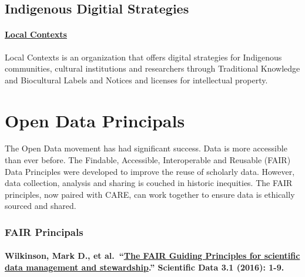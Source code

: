 \documentclass[
]{book}
\begin{document}
\hypertarget{indigenous-digitial-strategies}{%
\section{Indigenous Digitial Strategies}\label{indigenous-digitial-strategies}}

\hypertarget{local-contexts}{%
\subsubsection*{\texorpdfstring{\href{https://localcontexts.org/labels/biocultural-labels/}{Local Contexts}}{Local Contexts}}\label{local-contexts}}

Local Contexts is an organization that offers digital strategies for Indigenous communities, cultural institutions and researchers through Traditional Knowledge and Biocultural Labels and Notices and licenses for intellectual property.

\hypertarget{open-data-principals}{%
\chapter{Open Data Principals}\label{open-data-principals}}

The Open Data movement has had significant success. Data is more accessible than ever before. The Findable, Accessible, Interoperable and Reusable (FAIR) Data Principles were developed to improve the reuse of scholarly data. However, data collection, analysis and sharing is couched in historic inequities. The FAIR principles, now paired with CARE, can work together to ensure data is ethically sourced and shared.

\hypertarget{fair-principals}{%
\subsection{FAIR Principals}\label{fair-principals}}

\hypertarget{wilkinson-mark-d.-et-al.-the-fair-guiding-principles-for-scientific-data-management-and-stewardship.-scientific-data-3.1-2016-1-9.}{%
\subsubsection*{\texorpdfstring{Wilkinson, Mark D., et al.~``\href{https://www.nature.com/articles/sdata201618}{The FAIR Guiding Principles for scientific data management and stewardship}.'' Scientific Data 3.1 (2016): 1-9.}{Wilkinson, Mark D., et al.~``The FAIR Guiding Principles for scientific data management and stewardship.'' Scientific Data 3.1 (2016): 1-9.}}\label{wilkinson-mark-d.-et-al.-the-fair-guiding-principles-for-scientific-data-management-and-stewardship.-scientific-data-3.1-2016-1-9.}}
\end{document}
